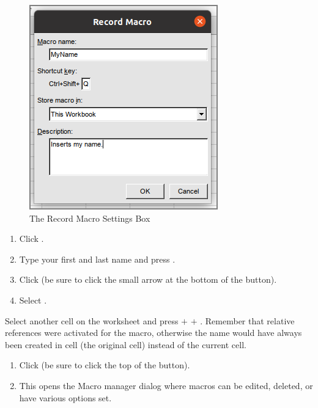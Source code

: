 \begin{figure}[H]
	\centering
	\includegraphics[width=\maxwidth{.95\linewidth}]{gfx/ch09_fig65}
	\caption{The Record Macro Settings Box}
	\label{09:fig65}
\end{figure}

\begin{enumerate}[resume]	
	\item Click .
	\item Type your first and last name and press .
	\item Click  (be sure to click the small arrow at the bottom of the  button).
	\item Select .
\end{enumerate}

Select another cell on the worksheet and press  $ + $  $ + $ . Remember that relative references were activated for the macro, otherwise the name would have always been created in cell  (the original cell) instead of the current cell.

\begin{enumerate}
	\item Click  (be sure to click the top of the  button).
	\item This opens the Macro manager dialog where macros can be edited, deleted, or have various options set.
\end{enumerate}

